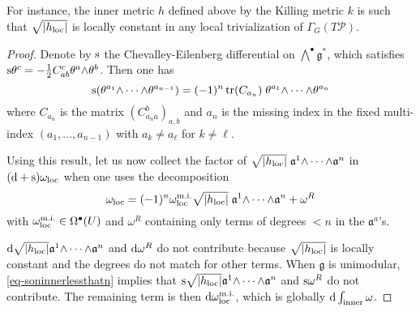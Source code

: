 \documentclass[number]{elsarticle}
\theoremstyle{definition}
\theoremstyle{remark}
\numberwithin{equation}{section}
\begin{document}
For instance, the inner metric $h$ defined above by the Killing metric $k$ is such that $\sqrt{|h_{{\text{\textup{loc}}}}|}$ is locally constant in any local trivialization of $\Gamma_G(T{{{{\mathcal{{P}}}}}})$.

\begin{proof}
Denote by ${\text{\textup{s}}}$ the Chevalley-Eilenberg differential on ${{\textstyle\bigwedge}}^{\bullet} {{\mathfrak g}}^\ast$, which satisfies ${\text{\textup{s}}} \theta^c = - \frac{1}{2} C^{c}_{a b} \theta^a {\mathord{\wedge}} \theta^b$. Then one has
\begin{equation}
\label{eq-soninnerlessthatn}
{\text{\textup{s}}} (\theta^{a_1} {\mathord{\wedge}} \cdots {\mathord{\wedge}} \theta^{a_{n-1}}) = (-1)^{n} \operatorname{tr} (C_{a_n})\; \theta^{a_1} {\mathord{\wedge}} \cdots {\mathord{\wedge}} \theta^{a_n}
\end{equation}
where $C_{a_n}$ is the matrix $(C_{a_n a}^{b})_{a,b}$ and $a_n$ is the missing index in the fixed multi-index $(a_1, \dots, a_{n-1})$ with $a_k \neq a_\ell$ for $k \neq \ell$. 

Using this result, let us now collect the factor of $\sqrt{|h_{{\text{\textup{loc}}}}|}\; {\mathfrak{a}}^{1} {\mathord{\wedge}} \cdots {\mathord{\wedge}} {\mathfrak{a}}^{n}$ in $({\text{\textup{d}}} + {\text{\textup{s}}}) \omega_{{\text{\textup{loc}}}}$ when one uses the decomposition 
\begin{equation*}
\omega_{{\text{\textup{loc}}}} = (-1)^n \omega^{{\text{m.i.}}}_{{\text{\textup{loc}}}} \sqrt{|h_{{\text{\textup{loc}}}}|}\; {\mathfrak{a}}^{1} {\mathord{\wedge}} \cdots {\mathord{\wedge}} {\mathfrak{a}}^{n} + \omega^R
\end{equation*}
with $\omega^{{\text{m.i.}}}_{{\text{\textup{loc}}}} \in \Omega^{\bullet}(U)$ and $\omega^R$ containing only terms of degrees $< n$ in the ${\mathfrak{a}}^a$'s.

${\text{\textup{d}}} \sqrt{|h_{{\text{\textup{loc}}}}|} {\mathfrak{a}}^{1} {\mathord{\wedge}} \cdots {\mathord{\wedge}} {\mathfrak{a}}^{n}$ and ${\text{\textup{d}}} \omega^R$ do not contribute because $\sqrt{|h_{{\text{\textup{loc}}}}|}$ is locally constant and the degrees do not match for other terms. When ${{\mathfrak g}}$ is unimodular, \eqref{eq-soninnerlessthatn} implies that ${\text{\textup{s}}} \sqrt{|h_{{\text{\textup{loc}}}}|} {\mathfrak{a}}^{1} {\mathord{\wedge}} \cdots {\mathord{\wedge}} {\mathfrak{a}}^{n}$ and ${\text{\textup{s}}} \omega^R$ do not contribute. The remaining term is then ${\text{\textup{d}}} \omega^{{\text{m.i.}}}_{{\text{\textup{loc}}}}$, which is globally ${\text{\textup{d}}} \int_{{\text{\textup{inner}}}} \omega$.
\end{proof}
\end{document}
